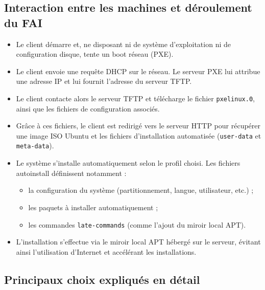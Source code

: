 \documentclass[a4paper,12pt]{article}
\begin{document}
\subsection{Interaction entre les machines et déroulement du FAI}
\begin{itemize}
  \item Le client démarre et, ne disposant ni de système d’exploitation ni de configuration disque, tente un boot réseau (PXE).
  \item Le client envoie une requête DHCP sur le réseau. Le serveur PXE lui attribue une adresse IP et lui fournit l’adresse du serveur TFTP.
  \item Le client contacte alors le serveur TFTP et télécharge le fichier \texttt{pxelinux.0}, ainsi que les fichiers de configuration associés.
  \item Grâce à ces fichiers, le client est redirigé vers le serveur HTTP pour récupérer une image ISO Ubuntu et les fichiers d’installation automatisée (\texttt{user-data} et \texttt{meta-data}).
  \item Le système s’installe automatiquement selon le profil choisi. Les fichiers autoinstall définissent notamment :
  \begin{itemize}
    \item la configuration du système (partitionnement, langue, utilisateur, etc.) ;
    \item les paquets à installer automatiquement ;
    \item les commandes \texttt{late-commands} (comme l’ajout du miroir local APT).
  \end{itemize}
  \item L’installation s’effectue via le miroir local APT hébergé sur le serveur, évitant ainsi l’utilisation d’Internet et accélérant les installations.
\end{itemize}

\subsection{Principaux choix expliqués en détail}
\end{document}
